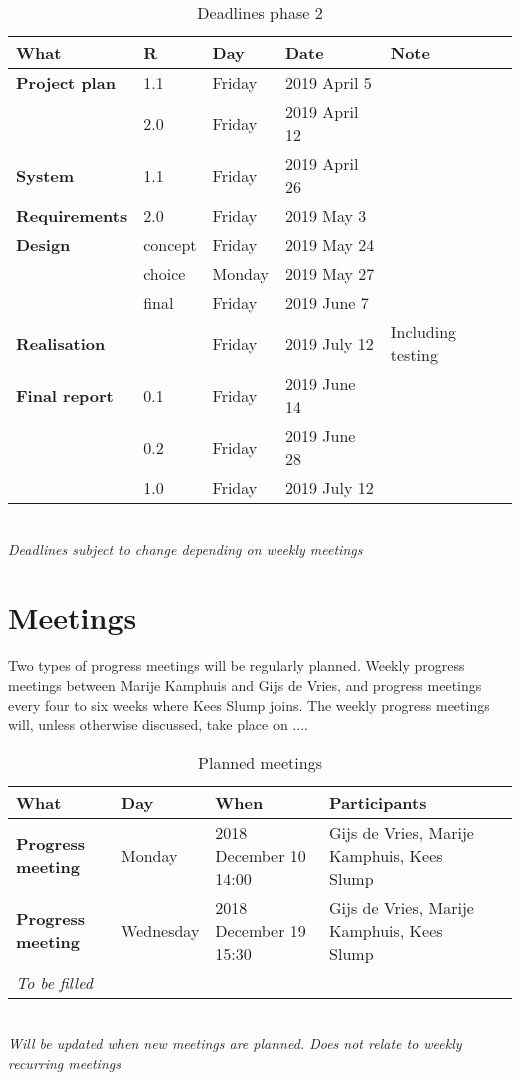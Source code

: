 \begin{table}[h!]
	\begin{tabular}{l|llll}
		\textbf{What} 		&	R	& 	Day	&	Date	&	Note \\
		\hline
		\textbf{Project plan}& 1.1	& Friday 		& 2019 April 5	&	 \\
		\rowcolor{Gray}
		 	&	2.0 	&	 Friday & 2019 April 12 & \\
		 	\hline
		\textbf{System} & 1.1 & Friday & 2019 April 26 & \\
		\rowcolor{Gray}
		\textbf{Requirements}& 2.0 & Friday & 2019 May 3 & \\
		\hline
		\textbf{Design} & concept & Friday & 2019 May 24 & \\
		\rowcolor{Gray}
		 & choice & Monday & 2019 May 27 &  \\
		 & final  & Friday & 2019 June 7 & \\
		 \rowcolor{Gray}
		 \hline
		 \textbf{Realisation} & & Friday & 2019 July 12 & Including testing\\
		 \hline
		 \textbf{Final report} & 0.1 & Friday & 2019 June 14 & \\
		 \rowcolor{Gray}
		 & 0.2 & Friday & 2019 June 28 & \\
		 & 1.0 & Friday & 2019 July 12 & \\
		 \hline
	\end{tabular} \\
	\textit{Deadlines subject to change depending on weekly meetings}
	\caption{Deadlines phase 2}
	\label{tab:deadlines2}
\end{table}

\section{Meetings}
Two types of progress meetings will be regularly planned. Weekly progress meetings between Marije Kamphuis and Gijs de Vries, and progress meetings every four to six weeks where Kees Slump joins. The weekly progress meetings will, unless otherwise discussed, take place on ....

\begin{table}[h!]
	\hspace*{-1.2cm}\begin{tabular}{l|llll}
		\textbf{What} 		& 	Day	&	When	&	Participants \hfill \\
		\hline
		\textbf{Progress meeting} & Monday 		& 2018 December 10	14:00 &	 Gijs de Vries, Marije Kamphuis, Kees Slump\\
		\rowcolor{Gray}
		 \textbf{Progress meeting} & Wednesday 	& 2018 December 19	15:30 &	 Gijs de Vries, Marije Kamphuis, Kees Slump\\
		 \textit{To be filled}\\
		 \hline
	\end{tabular}\hspace*{-1.2cm} \\
	\textit{Will be updated when new meetings are planned. Does not relate to weekly recurring meetings}
	\caption{Planned meetings}
	\label{tab:planned_meet}
\end{table}